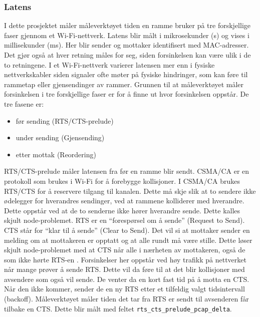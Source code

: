 \documentclass[norsk]{uiobachelorthesis}
\begin{document}
	\subsubsection{Latens}
	\label{sec:latens}
I dette prosjektet måler måleverktøyet tiden en ramme bruker på tre forskjellige faser gjennom et Wi-Fi-nettverk. Latens blir målt i mikrosekunder (\textmu{}s) og vises i millisekunder (ms). Her blir sender og mottaker identifisert med MAC-adresser. Det gjør også at hver retning måles for seg, siden forsinkelsen kan være ulik i de to retningene. I et Wi-Fi-nettverk varierer latensen mer enn i fysiske nettverkskabler siden signaler ofte møter på fysiske hindringer, som kan føre til rammetap eller gjensendinger av rammer. Grunnen til at måleverktøyet måler forsinkelsen i tre forskjellige faser er for å finne ut hvor forsinkelsen oppstår. De tre fasene er: 
\begin{itemize}
\item [-] før sending (RTS/CTS-prelude)
\item [-] under sending (Gjensending)
\item[-] etter mottak (Reordering)
\end{itemize}
RTS/CTS-prelude måler latensen fra før en ramme blir sendt. CSMA/CA er en protokoll som brukes i Wi-Fi for å forebygge kollisjoner. I CSMA/CA brukes RTS/CTS for å reservere tilgang til kanalen. Dette må skje slik at to sendere ikke ødelegger for hverandres sendinger, ved at rammene kolliderer med hverandre. Dette oppstår ved at de to senderne ikke hører hverandre sende. Dette kalles skjult node-problemet. RTS er en \enquote{forespørsel om å sende} (Request to Send). CTS står for \enquote{klar til å sende} (Clear to Send). Det vil si at mottaker sender en melding om at mottakeren er opptatt og at alle rundt må være stille. Dette løser skjult node-problemet med at CTS når alle i nærheten av mottakeren, også de som ikke hørte RTS-en \parencite[avsnitt~7.3.1]{kurose2025}. Forsinkelser her oppstår ved høy trafikk på nettverket når mange prøver å sende RTS. Dette vil da føre til at det blir kollisjoner med avsendere som også vil sende. De venter da en kort fast tid på å motta en CTS. Når den ikke kommer, sender de en ny RTS etter et tilfeldig valgt tidsintervall (backoff). Måleverktøyet måler tiden det tar fra RTS er sendt til avsenderen får tilbake en CTS. Dette blir målt med feltet \texttt{rts\_cts\_prelude\_pcap\_delta}. 
\end{document}
